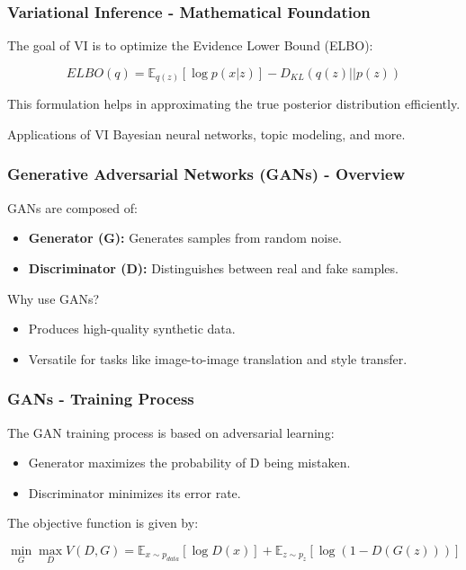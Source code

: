 \documentclass[aspectratio=169]{beamer}
\begin{document}
\begin{frame}[fragile]
    \frametitle{Variational Inference - Mathematical Foundation}
    The goal of VI is to optimize the Evidence Lower Bound (ELBO):

    \begin{equation}
        ELBO(q) = \mathbb{E}_{q(z)}[\log p(x|z)] - D_{KL}(q(z) || p(z))
    \end{equation}

    This formulation helps in approximating the true posterior distribution efficiently.

    \vspace{1em}
    \begin{block}{Applications of VI}
        Bayesian neural networks, topic modeling, and more.
    \end{block}
\end{frame}

\begin{frame}[fragile]
    \frametitle{Generative Adversarial Networks (GANs) - Overview}
    GANs are composed of:
    
    \begin{itemize}
        \item \textbf{Generator (G):} Generates samples from random noise.
        \item \textbf{Discriminator (D):} Distinguishes between real and fake samples.
    \end{itemize}

    Why use GANs?
    \begin{itemize}
        \item Produces high-quality synthetic data.
        \item Versatile for tasks like image-to-image translation and style transfer.
    \end{itemize}
\end{frame}

\begin{frame}[fragile]
    \frametitle{GANs - Training Process}
    The GAN training process is based on adversarial learning:
    
    \begin{itemize}
        \item Generator maximizes the probability of D being mistaken.
        \item Discriminator minimizes its error rate.
    \end{itemize}

    The objective function is given by:

    \begin{equation}
        \min_G \max_D V(D, G) = \mathbb{E}_{x \sim p_{data}}[\log D(x)] + \mathbb{E}_{z \sim p_z}[\log(1 - D(G(z)))]
    \end{equation}
\end{frame}
\end{document}
